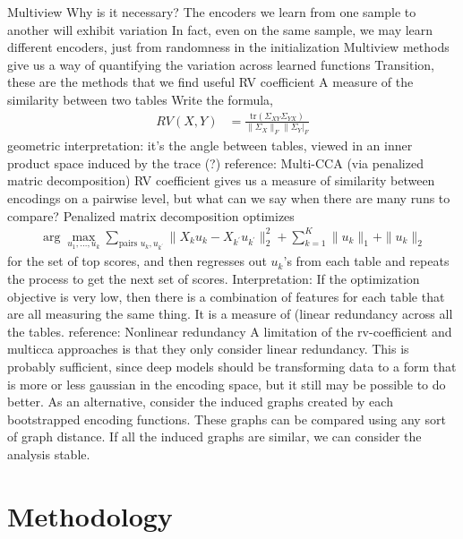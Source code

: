 \documentclass[11pt]{article}
\begin{document}
\begin{outline}
\1 Multiview
  \2 Why is it necessary?
    \3 The encoders we learn from one sample to another will exhibit variation
      \4 In fact, even on the same sample, we may learn different encoders, just
      from randomness in the initialization
    \3 Multiview methods give us a way of quantifying the variation across
    learned functions
  \2 Transition, these are the methods that we find useful
  \2 RV coefficient
    \3 A measure of the similarity between two tables
    \3 Write the formula,
    \begin{align}
      RV\left(X, Y\right) &= \frac{\text{tr}\left(\Sigma_{XY}\Sigma_{YX}\right)}{\|\Sigma_{X}\|_{F}\|\Sigma_{Y}|_{F}}
    \end{align}
    \3 geometric interpretation: it's the angle between tables, viewed in an
    inner product space induced by the trace (?)
    \3 reference: \citep{josse2016measuring}
  \2 Multi-CCA (via penalized matric decomposition)
    \3 RV coefficient gives us a measure of similarity between encodings on a
    pairwise level, but what can we say when there are many runs to compare?
    \3 Penalized matrix decomposition optimizes
    \begin{align}
      \arg\max_{u_1, \dots, u_{k}} \sum_{\text{pairs } u_{k}, u_{k^{\prime}}} \|X_{k}u_{k} - X_{k^{\prime}}u_{k^{\prime}}\|_{2}^{2} + \sum_{k = 1}^{K} \|u_{k}\|_{1} + \|u_{k}\|_{2}
    \end{align}
    for the set of top scores, and then regresses out $u_{k}$'s from each table
    and repeats the process to get the next set of scores.
    \3 Interpretation: If the optimization objective is very low, then there is
    a combination of features for each table that are all measuring the same
    thing. It is a measure of (linear redundancy across all the tables.
    \3 reference: \citep{witten2009penalized}
  \2 Nonlinear redundancy \citep{donnat2018tracking}
    \3 A limitation of the rv-coefficient and multicca approaches is that they
    only consider linear redundancy. This is probably sufficient, since deep
    models should be transforming data to a form that is more or less gaussian
    in the encoding space, but it still may be possible to do better.
    \3 As an alternative, consider the induced graphs created by each
    bootstrapped encoding functions. These graphs can be compared using any sort
    of graph distance.
    \3 If all the induced graphs are similar, we can consider the analysis stable.
\end{outline}

\section{Methodology}
\end{document}
